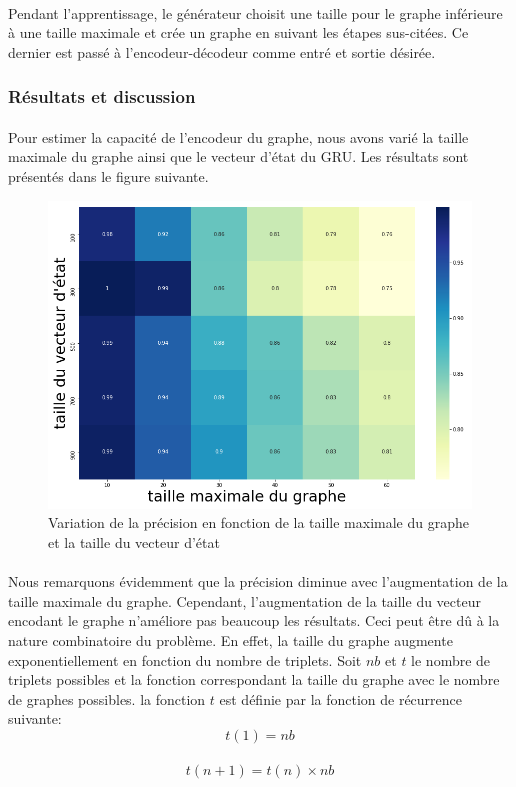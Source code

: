 \paragraph{}Pendant l'apprentissage, le générateur choisit une taille pour le graphe inférieure à une taille maximale et crée un graphe en suivant les étapes sus-citées. Ce dernier est passé à l'encodeur-décodeur comme entré et sortie désirée.
\subsubsection{Résultats et discussion}
\paragraph{}Pour estimer la capacité de l'encodeur du graphe, nous avons varié la taille maximale du graphe ainsi que le vecteur d'état du GRU. Les résultats sont présentés dans le figure suivante.
\begin{figure}[H] 
	\centering
	\includegraphics[width=0.95\linewidth]{images/Realisation/DM/heatmap.png}
	\caption{Variation de la précision en fonction de la taille maximale du graphe et la taille du vecteur d'état}\label{heatmap}
\end{figure}
\paragraph{}Nous remarquons évidemment que la précision diminue avec l'augmentation de la taille maximale du graphe. Cependant, l'augmentation de la taille du vecteur encodant le graphe n'améliore pas beaucoup les résultats. Ceci peut être dû à la nature combinatoire du problème. En effet, la taille du graphe augmente exponentiellement en fonction du nombre de triplets. Soit $nb$ et $t$ le nombre de triplets possibles et la fonction correspondant la taille du graphe avec le nombre de graphes possibles. la fonction $t$ est définie par la fonction de récurrence suivante:
\[t(1) = nb\]\\
\[t(n+1) = t(n) \times nb\]
